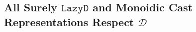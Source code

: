 \documentclass[acmsmall,review,anonymous]{acmart}\settopmatter{printfolios=true,printccs=false,printacmref=false}
\newcommand{\lazyD}{$\mathtt{Lazy D}$}
\newcommand{\sOOinspect}[3]{\mathtt{Eval} \; #1 \; #2 \; #3}
\newcommand{\sOOreturn}[2]{\mathtt{Cont} \; #2 \; #1}
\newcommand{\sOOhalt}[1]{\mathtt{Halt} \; #1}
\newcommand{\judgeSreduce}[3]{#2 \longrightarrow_{\mathcal{S}(#1)} #3}
\newcommand{\eqvS}[4]{#3 \approx_{\mathcal{S}\mathcal{S}} #4}
\begin{document}
\subsection{All Surely \lazyD{} and Monoidic Cast Representations Respect 
$\mathcal{D}$}



\end{document}
